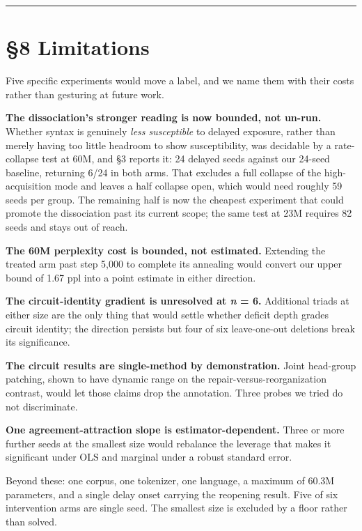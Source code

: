 \documentclass[11pt]{article}
\begin{document}
\begin{center}\rule{0.5\linewidth}{0.5pt}\end{center}

\section{§8 Limitations}\label{limitations}

Five specific experiments would move a label, and we name them with their costs rather than
gesturing at future work.

\textbf{The dissociation's stronger reading is now bounded, not un-run.} Whether syntax is
genuinely \emph{less susceptible} to delayed exposure, rather than merely having too little
headroom to show susceptibility, was decidable by a rate-collapse test at 60M, and §3 reports
it: 24 delayed seeds against our 24-seed baseline, returning 6/24 in both arms. That excludes
a full collapse of the high-acquisition mode and leaves a half collapse open, which would
need roughly 59 seeds per group. The remaining half is now the cheapest experiment that could
promote the dissociation past its current scope; the same test at 23M requires 82 seeds and
stays out of reach.

\textbf{The 60M perplexity cost is bounded, not estimated.} Extending the treated arm past step
5,000 to complete its annealing would convert our upper bound of 1.67 ppl into a point
estimate in either direction.

\textbf{The circuit-identity gradient is unresolved at \emph{n} = 6.} Additional triads at either size
are the only thing that would settle whether deficit depth grades circuit identity; the
direction persists but four of six leave-one-out deletions break its significance.

\textbf{The circuit results are single-method by demonstration.} Joint head-group patching, shown
to have dynamic range on the repair-versus-reorganization contrast, would let those claims
drop the annotation. Three probes we tried do not discriminate.

\textbf{One agreement-attraction slope is estimator-dependent.} Three or more further seeds at the
smallest size would rebalance the leverage that makes it significant under OLS and marginal
under a robust standard error.

Beyond these: one corpus, one tokenizer, one language, a maximum of 60.3M parameters, and a
single delay onset carrying the reopening result. Five of six intervention arms are single
seed. The smallest size is excluded by a floor rather than solved.
\end{document}
